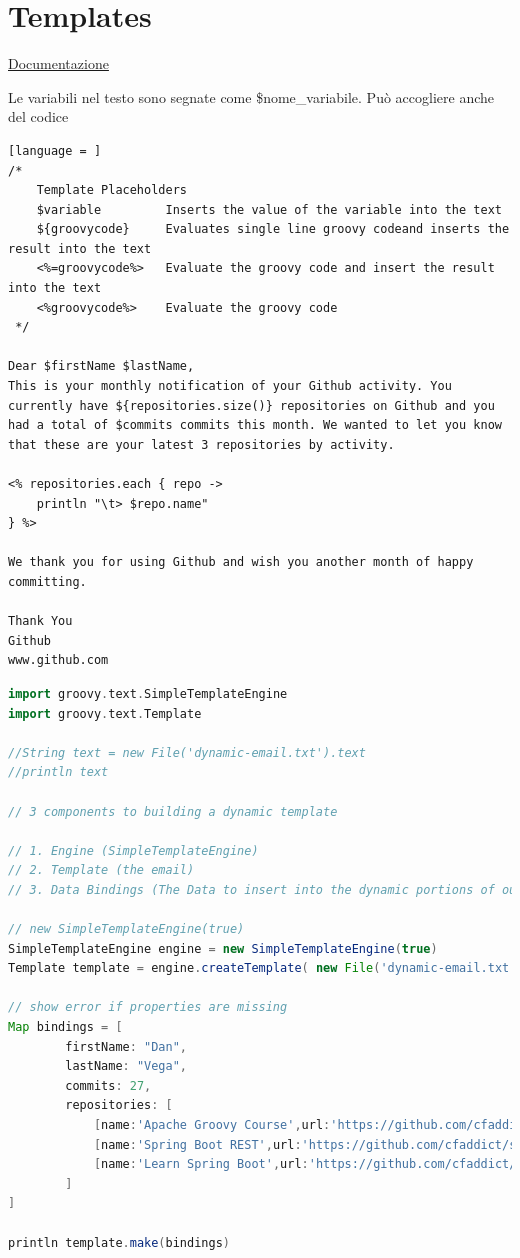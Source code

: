 \documentclass[11pt,a4paper]{book}
\begin{document}
\section{Templates}
\href{https://docs.groovy-lang.org/docs/next/html/documentation/template-engines.html}{Documentazione}

Le variabili nel testo sono segnate come \$nome\_variabile. Può accogliere anche del codice
\begin{lstlisting}[language = ]
/*
    Template Placeholders
    $variable         Inserts the value of the variable into the text
    ${groovycode}     Evaluates single line groovy codeand inserts the result into the text
    <%=groovycode%>   Evaluate the groovy code and insert the result into the text
    <%groovycode%>    Evaluate the groovy code
 */
 
Dear $firstName $lastName,
This is your monthly notification of your Github activity. You currently have ${repositories.size()} repositories on Github and you
had a total of $commits commits this month. We wanted to let you know that these are your latest 3 repositories by activity.

<% repositories.each { repo ->
    println "\t> $repo.name"
} %>

We thank you for using Github and wish you another month of happy committing.

Thank You
Github
www.github.com
\end{lstlisting}

\begin{lstlisting}[language = groovy]
import groovy.text.SimpleTemplateEngine
import groovy.text.Template

//String text = new File('dynamic-email.txt').text
//println text

// 3 components to building a dynamic template

// 1. Engine (SimpleTemplateEngine)
// 2. Template (the email)
// 3. Data Bindings (The Data to insert into the dynamic portions of our email)

// new SimpleTemplateEngine(true)
SimpleTemplateEngine engine = new SimpleTemplateEngine(true)
Template template = engine.createTemplate( new File('dynamic-email.txt') )

// show error if properties are missing
Map bindings = [
        firstName: "Dan",
        lastName: "Vega",
        commits: 27,
        repositories: [
            [name:'Apache Groovy Course',url:'https://github.com/cfaddict/apache-groovy-course'],
            [name:'Spring Boot REST',url:'https://github.com/cfaddict/spring-boot-rest'],
            [name:'Learn Spring Boot',url:'https://github.com/cfaddict/learnspringboot']
        ]
]

println template.make(bindings)
\end{lstlisting}
\end{document}
